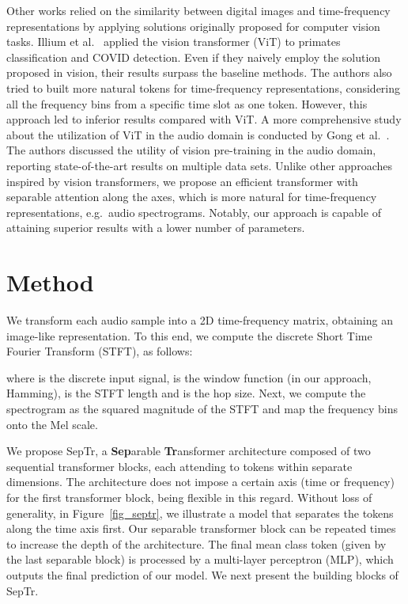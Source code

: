 \documentclass[a4paper]{article}
\begin{document}
Other works \cite{Gong-INTERSPEECH-2021,Illium-INTERSPEECH-2021} relied on the similarity between digital images and time-frequency representations by applying solutions originally proposed for computer vision tasks. Illium et al.~\cite{Illium-INTERSPEECH-2021} applied the vision transformer (ViT) \cite{Dosovitskiy-ICLR-2020} to primates classification and COVID detection. Even if they naively employ the solution proposed in vision, their results surpass the baseline methods. The authors also tried to built more natural tokens for time-frequency representations, considering all the frequency bins from a specific time slot as one token. However, this approach led to inferior results compared with ViT. A more comprehensive study about the utilization of ViT in the audio domain is conducted by Gong et al.~\cite{Gong-INTERSPEECH-2021}. The authors discussed the utility of vision pre-training in the audio domain, reporting state-of-the-art results on multiple data sets. Unlike other approaches inspired by vision transformers, we propose an efficient transformer with separable attention along the axes, which is more natural for time-frequency representations, e.g.~audio spectrograms. Notably, our approach is capable of attaining superior results with a lower number of parameters. 







\section{Method}

We transform each audio sample into a 2D time-frequency matrix, obtaining an image-like representation. To this end, we compute the discrete Short Time Fourier Transform (STFT), as follows:

where  is the discrete input signal,  is the window function (in our approach, Hamming),  is the STFT length and  is the hop size. Next, we compute the spectrogram as the squared magnitude of the STFT and map the frequency bins onto the Mel scale.

We propose SepTr, a \textbf{Sep}arable \textbf{Tr}ansformer architecture composed of two sequential transformer blocks, each attending to tokens within separate dimensions. The architecture does not impose a certain axis (time or frequency) for the first transformer block, being flexible in this regard. Without loss of generality, in Figure~\ref{fig_septr}, we illustrate a model that separates the tokens along the time axis first. Our separable transformer block can be repeated  times to increase the depth of the architecture. The final mean class token (given by the last separable block) is processed by a multi-layer perceptron (MLP), which outputs the final prediction of our model. We next present the building blocks of SepTr.
\end{document}
